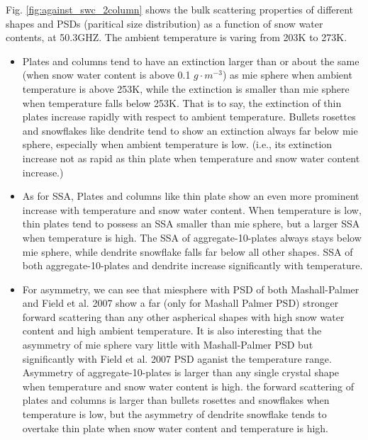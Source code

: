 Fig. \ref{fig:against_swc_2column} shows the bulk scattering properties of different shapes and PSDs (paritical size distribution) as a
function of snow water contents, at 50.3GHZ. The ambient temperature is varing from 203K to 273K. 

\begin{itemize}
    \item {} 
    
    Plates and columns tend to have an extinction larger than or about the same (when snow water content is above 0.1 $g \cdot m^{-3}$) as mie sphere when ambient temperature is above 253K,
while the extinction is smaller than mie sphere when temperature falls below 253K. That is to say, the extinction of thin plates increase rapidly with respect to ambient temperature.
Bullets rosettes and snowflakes like dendrite tend to show an extinction always far below mie sphere, especially when ambient temperature is low. (i.e., its extinction
increase not as rapid as thin plate when temperature and snow water content increase.)

    \item {} 
    
    As for SSA, Plates and columns like thin plate show an even more prominent increase with temperature and snow water content. When temperature is low,
thin plates tend to possess an SSA smaller than mie sphere, but a larger SSA when temperature is high. The SSA of aggregate-10-plates 
always stays below mie sphere, while dendrite snowflake falls far below all other shapes. SSA of both aggregate-10-plates and dendrite
increase significantly with temperature.

    \item {} 
    
    For asymmetry, we can see that miesphere with PSD of both Mashall-Palmer and Field et al. 2007 show a far (only for Mashall Palmer PSD) 
stronger forward scattering than any other aspherical shapes with high snow water content and high ambient temperature. 
It is also interesting that the asymmetry of mie sphere vary little with Mashall-Palmer PSD but significantly with Field et al. 2007 PSD aganist the temperature range.
Asymmetry of aggregate-10-plates is larger than any single crystal shape when temperature and snow water content is high.
the forward scattering of plates and columns is larger than bullets rosettes and snowflakes when temperature is low, but the asymmetry
of dendrite snowflake tends to overtake thin plate when snow water content and temperature is high.
\end{itemize}

